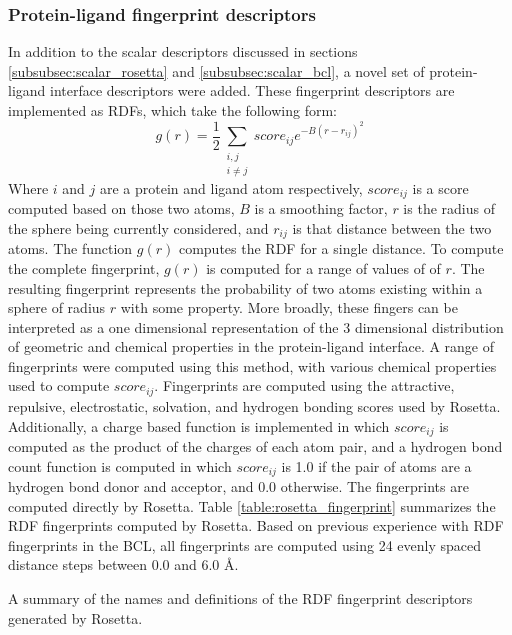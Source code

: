 \subsubsection{Protein-ligand fingerprint descriptors}
In addition to the scalar descriptors  discussed in sections \ref{subsubsec:scalar_rosetta} and \ref{subsubsec:scalar_bcl}, a novel set of protein-ligand interface descriptors were added.
These fingerprint descriptors are implemented as \ac{RDF}s, which take the following form:
\begin{equation}
g(r) = \frac{1}{2}\sum_{\substack{i,j \\ i \neq j}}score_{ij}e^{-B(r-r_{ij})^{2}}
\end{equation}
Where $i$ and $j$ are a protein and ligand atom respectively, $score_{ij}$ is a score computed based on those two atoms, $B$ is a smoothing factor, $r$ is the radius of the sphere being currently considered, and $r_{ij}$ is that distance between the two atoms.
The function $g(r)$ computes the \ac{RDF} for a single distance.  To compute the complete fingerprint, $g(r)$ is computed for a range of values of of $r$.
The resulting fingerprint represents the probability of two atoms existing within a sphere of radius $r$ with some property. 
More broadly, these fingers can be interpreted as a one dimensional representation of the 3 dimensional distribution of geometric and chemical properties in the protein-ligand interface. 
A range of fingerprints were computed using this method, with various chemical properties used to compute $score_{ij}$.
Fingerprints are computed using the attractive, repulsive, electrostatic, solvation, and hydrogen bonding scores used by Rosetta.  Additionally, a charge based function is implemented in which $score_{ij}$ is computed as the product of the charges of each atom pair, and a hydrogen bond count function is computed in which $score_{ij}$ is 1.0 if the pair of atoms are a hydrogen bond donor and acceptor, and 0.0 otherwise.
The fingerprints are computed directly by Rosetta.
Table \ref{table:rosetta_fingerprint} summarizes the \ac{RDF} fingerprints computed by Rosetta.
Based on previous experience with \ac{RDF} fingerprints in the \ac{BCL}, all fingerprints are computed using 24 evenly spaced distance steps between 0.0 and 6.0 \AA.
\begin{table}
\scriptsize
\renewcommand{\tabcolsep}{0.09cm}
\centering

\caption{A summary of the names and definitions of the \acs{RDF} fingerprint descriptors generated by Rosetta. }
\label{table:rosetta_fingerprint}
\end{table}


